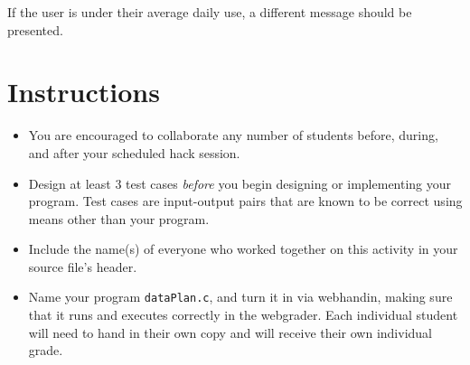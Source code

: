 \documentclass[12pt]{scrartcl}
\begin{document}
If the user is under their average daily use, a different
message should be presented.  

\section*{Instructions}

\begin{itemize}
  \item You are encouraged to collaborate any number of students 
  before, during, and after your scheduled hack session.  
  \item Design at least 3 test cases \emph{before} you begin
  designing or implementing your program.  Test cases are 
  input-output pairs that are known to be correct using means
  other than your program.
  \item Include the name(s) of everyone who worked together on
  this activity in your source file's header.
  \item Name your program \texttt{dataPlan.c}, and
  turn it in via webhandin, making sure that it runs and executes
  correctly in the webgrader.  Each individual student will need
  to hand in their own copy and will receive their own individual
  grade.
\end{itemize}
  
\end{document}
